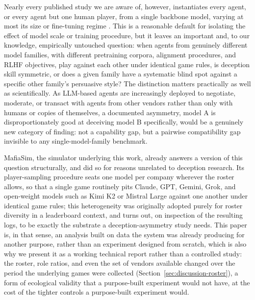 \documentclass{article}
\begin{document}
Nearly every published study we are aware of, however, instantiates every agent, or every agent but one human player, from a single backbone model, varying at most its size or fine-tuning regime \citep{eckhaus2025time,zhang2025dvm,mittal2026triadic}. This is a reasonable default for isolating the effect of model scale or training procedure, but it leaves an important and, to our knowledge, empirically untouched question: when agents from genuinely different model families, with different pretraining corpora, alignment procedures, and RLHF objectives, play against each other under identical game rules, is deception skill symmetric, or does a given family have a systematic blind spot against a specific other family's persuasive style? The distinction matters practically as well as scientifically. As LLM-based agents are increasingly deployed to negotiate, moderate, or transact with agents from other vendors rather than only with humans or copies of themselves, a documented asymmetry, model A is disproportionately good at deceiving model B specifically, would be a genuinely new category of finding: not a capability gap, but a pairwise compatibility gap invisible to any single-model-family benchmark.

MafiaSim, the simulator underlying this work, already answers a version of this question structurally, and did so for reasons unrelated to deception research. Its player-sampling procedure seats one model per company wherever the roster allows, so that a single game routinely pits Claude, GPT, Gemini, Grok, and open-weight models such as Kimi K2 or Mistral Large against one another under identical game rules; this heterogeneity was originally adopted purely for roster diversity in a leaderboard context, and turns out, on inspection of the resulting logs, to be exactly the substrate a deception-asymmetry study needs. This paper is, in that sense, an analysis built on data the system was already producing for another purpose, rather than an experiment designed from scratch, which is also why we present it as a working technical report rather than a controlled study: the roster, role ratios, and even the set of vendors available changed over the period the underlying games were collected (Section~\ref{sec:discussion-roster}), a form of ecological validity that a purpose-built experiment would not have, at the cost of the tighter controls a purpose-built experiment would.
\end{document}
